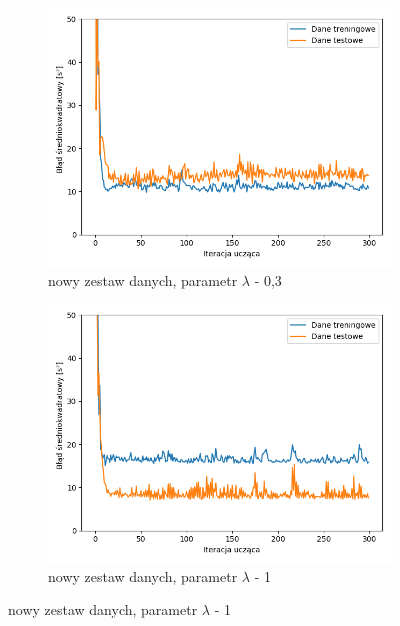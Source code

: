 \documentclass[12pt]{aghdpl}
\begin{document}
\begin{figure}[h]
		 	\begin{subfigure}{.5\linewidth}
		 		\includegraphics[width =\linewidth]{wykresy/8_zebranie_wiekszej_ilosci_danych/200-400/regularyzacja_0_3_wykres_uczenia.png}
		 		\caption{nowy zestaw danych, parametr $\lambda$ - 0,3}
		 	\end{subfigure}
		 	\begin{subfigure}{.5\linewidth}
		 		\includegraphics[width =\linewidth]{wykresy/8_zebranie_wiekszej_ilosci_danych/200-400/regularyzacja_1_wykres_uczenia.png}
		 		\caption{nowy zestaw danych, parametr $\lambda$ - 1}
		 	\end{subfigure}
		 	

\end{figure}
\end{document}
